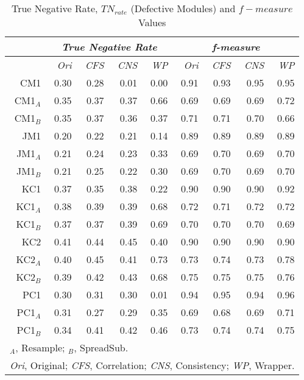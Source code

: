\documentclass{elsart}
\begin{document}
\begin{table}[t]
\caption{True Negative Rate, $TN_{rate}$ (Defective Modules) and
$f-measure$ Values} \label{tab:NBTNrfmesure}
\begin{center}
\begin{small}\begin{tabular}{r|rrrr|rrrr}
\hline
 \multicolumn{ 1}{c}{} & \multicolumn{4}{c}{\emph{True Negative Rate}} & \multicolumn{4}{c}{\emph{f-measure}} \\
\hline
 & \emph{Ori} & \emph{CFS} & \emph{CNS} & \emph{WP} & \emph{Ori} & \emph{CFS} & \emph{CNS} & \emph{WP} \\
\hline \hline
     CM1 &  0.30 &  0.28 &  0.01 &   0.00  &    0.91 &   0.93 &  0.95 &  0.95  \\
 CM1$_A$ &  0.35 &  0.37 &  0.37 &   0.66  &    0.69 &   0.69 &  0.69 &  0.72  \\
 CM1$_B$ &  0.35 &  0.37 &  0.36 &   0.37  &    0.71 &   0.71 &  0.70 &  0.66 \\
     JM1 &  0.20 &  0.22 &  0.21 &   0.14  &    0.89 &   0.89 &  0.89 &  0.89  \\
 JM1$_A$ &  0.21 &  0.24 &  0.23 &   0.33  &    0.69 &   0.70 &  0.69 &  0.70  \\
 JM1$_B$ &  0.21 &  0.25 &  0.22 &   0.30  &    0.69 &   0.70 &  0.69 &  0.70  \\
     KC1 &  0.37 &  0.35 &  0.38 &   0.22  &    0.90 &   0.90 &  0.90 &  0.92  \\
 KC1$_A$ &  0.38 &  0.39 &  0.39 &   0.68  &    0.72 &   0.71 &  0.72 &  0.72 \\
 KC1$_B$ &  0.37 &  0.37 &  0.39 &   0.69  &    0.70 &   0.70 &  0.70 &  0.69 \\
     KC2 &  0.41 &  0.44 &  0.45 &   0.40  &    0.90 &   0.90 &  0.90 &  0.90 \\
 KC2$_A$ &  0.40 &  0.45 &  0.41 &   0.73  &    0.73 &   0.74 &  0.73 &  0.78  \\
 KC2$_B$ &  0.39 &  0.42 &  0.43 &   0.68  &    0.75 &   0.75 &  0.75 &  0.76 \\
     PC1 &  0.30 &  0.31 &  0.30 &   0.01  &    0.94 &   0.95 &  0.94 &  0.96  \\
 PC1$_A$ &  0.31 &  0.27 &  0.29 &   0.35  &    0.69 &   0.68 &  0.69 &  0.71  \\
 PC1$_B$ &  0.34 &  0.41 &  0.42 &   0.46  &    0.73 &   0.74 &  0.74 &  0.75 \\
\hline
\multicolumn{9}{l}{\scriptsize $_{A}$, Resample; $_{B}$, SpreadSub.}\\
\multicolumn{9}{l}{\scriptsize \emph{Ori}, Original; \emph{CFS}, Correlation; \emph{CNS}, Consistency; \emph{WP}, Wrapper.}\\
\end{tabular}
\end{small}
\end{center}
\end{table}
\end{document}

